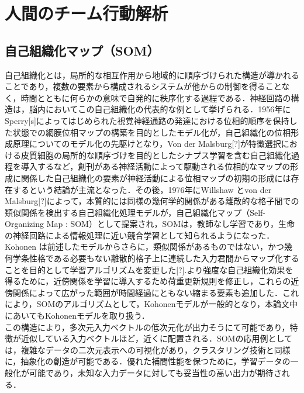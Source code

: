 \chapter{人間のチーム行動解析}

\section{自己組織化マップ（SOM）}
自己組織化とは，局所的な相互作用から地域的に順序づけられた構造が導かれることであり，複数の要素から構成されるシステムが他からの制御を得ることなく，時間とともに何らかの意味で自発的に秩序化する過程である．神経回路の構造は，脳内においてこの自己組織化の代表的な例として挙げられる．1956年にSperry[s]によってはじめられた視覚神経通路の発達における位相的順序を保持した状態での網膜位相マップの構築を目的としたモデル化が，自己組織化の位相形成原理についてのモデル化の先駆けとなり，Von der Malsburg[?]が特徴選択における皮質細胞の局所的な順序づけを目的としたシナプス学習を含む自己組織化過程を導入するなど，創刊がある神経活動によって駆動される位相的なマップの形成に関係した自己組織化の要素が神経活動による位相マップの初期の形成には存在するという結論が主流となった．その後，1976年にWillshaw とvon der Malsburg[?]によって，本質的には同様の幾何学的関係がある離散的な格子間での類似関係を検出する自己組織化処理モデルが，自己組織化マップ（Self-Organizing Map : SOM）として提案され，SOMは，教師なし学習であり，生命の神経回路による情報処理に近い競合学習として知られるようになった．\\
Kohonen は前述したモデルからさらに，類似関係があるものではない，かつ幾何学条性格である必要もない離散的格子上に連続した入力君間からマップ化することを目的として学習アルゴリズムを変更した[?].より強度な自己組織化効果を得るために，近傍関係を学習に導入するため荷重更新規則を修正し，これらの近傍関係によって広がった範囲が時間経過にともない縮まる要素も追加した．これにより，SOMのアルゴリズムとして，Kohonenモデルが一般的となり，本論文中にあいてもKohonenモデルを取り扱う．\\
この構造により，多次元入力ベクトルの低次元化が出力そうにて可能であり，特徴が近似している入力ベクトルほど，近くに配置される．SOMの応用例としては，複雑なデータの二次元表示への可視化があり，クラスタリング技術と同様に，抽象化の創造が可能である．優れた補間性能を保つために，学習データの一般化が可能であり，未知な入力データに対しても妥当性の高い出力が期待される．

